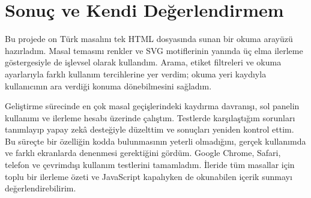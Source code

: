 \documentclass[12pt,a4paper]{article}
\begin{document}

\section{Sonuç ve Kendi Değerlendirmem}
Bu projede on Türk masalını tek HTML dosyasında sunan bir okuma arayüzü hazırladım. Masal temasını renkler ve SVG motiflerinin yanında üç elma ilerleme göstergesiyle de işlevsel olarak kullandım. Arama, etiket filtreleri ve okuma ayarlarıyla farklı kullanım tercihlerine yer verdim; okuma yeri kaydıyla kullanıcının ara verdiği konuma dönebilmesini sağladım.

Geliştirme sürecinde en çok masal geçişlerindeki kaydırma davranışı, sol panelin kullanımı ve ilerleme hesabı üzerinde çalıştım. Testlerde karşılaştığım sorunları tanımlayıp yapay zekâ desteğiyle düzelttim ve sonuçları yeniden kontrol ettim. Bu süreçte bir özelliğin kodda bulunmasının yeterli olmadığını, gerçek kullanımda ve farklı ekranlarda denenmesi gerektiğini gördüm. Google Chrome, Safari, telefon ve çevrimdışı kullanım testlerini tamamladım. İleride tüm masallar için toplu bir ilerleme özeti ve JavaScript kapalıyken de okunabilen içerik sunmayı değerlendirebilirim.

\clearpage
\end{document}
